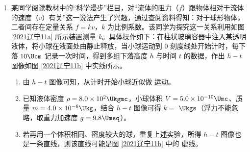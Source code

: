 \documentclass[\gkver]{gaokaozhenti}
\begin{document}
\begin{enumerate}
{代入 $\mu_0\leqslant\mu\leqslant1.2\mu_0$，可得

$L_1<\frac{5h}{3\mu_0}$，$L_1+L_2>\frac{2h}{\mu_0}$

综合需满足

$\frac{h}{\mu_0}<L_1<\frac{5h}{3\mu_0}$，$L_1+L_2>\frac{2h}{\mu_0}$

故选 CD。
}

\item
某同学阅读教材中的“科学漫步”栏目，对“流体的阻力（$f$）跟物体相对于流体的速度（$v$）有关”这一说法产生了兴趣，通过查阅资料得知：对于球形物体，二者间存在定量关系 $f=kv$，$k$ 为比例系数。该同学为探究这一关系利用如图 \ref{2021辽宁11a} 所示装置测量 $k$。具体操作如下：在柱状玻璃容器中注入某透明液体，将小球在液面处由静止释放，当小球运动到 0 刻度线处开始计时，每下落 $10\Ucm$ 记录一次时间，得到多组下落高度 $h$ 与时间 $t$ 的数据，作出 $h-t$ 图像如图 \ref{2021辽宁11b} 中实线所示。


\begin{enumerate}
	\item
	由 $h-t$ 图像可知，从计时开始小球近似做  运动。
	\item
	已知液体密度 $\rho=8.0\times10^2\Ukgmc$，小球体积 $V=5.0\times10^{-10}\Umc$、质量 $m=4.0\times10^{-6}\Ukg$，结合 $h-t$ 图像可得 $k=$  $\Ukgs$（浮力不能忽略，取重力加速度 $g=9.8\Umsq$）。
	\item
	若再用一个体积相同、密度较大的球，重复上述实验，所得 $h-t$ 图像也是一条直线，则该直线可能是图 \ref{2021辽宁11b} 中的  虚线。
\end{enumerate}

\end{enumerate}
\end{document}
